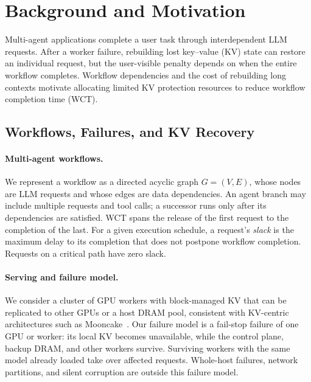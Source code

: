 \section{Background and Motivation}
\label{sec:background-motivation}

Multi-agent applications complete a user task through interdependent LLM
requests. After a worker failure, rebuilding lost key--value (KV) state can
restore an individual request, but the user-visible penalty depends on when
the entire workflow completes. Workflow dependencies and the cost of
rebuilding long contexts motivate allocating limited KV protection resources
to reduce workflow completion time (WCT).



\subsection{Workflows, Failures, and KV Recovery}
\label{sec:motivation-background}

\paragraph{Multi-agent workflows.}
We represent a workflow as a directed acyclic graph $G=(V,E)$, whose nodes
are LLM requests and whose edges are data dependencies. An agent branch may
include multiple requests and tool calls; a successor runs only after its
dependencies are satisfied. WCT spans the release of the first request to
the completion of the last. For a given execution schedule, a request's
\emph{slack} is the maximum delay to its completion that does not postpone
workflow completion. Requests on a critical path have zero slack.

\paragraph{Serving and failure model.}
We consider a cluster of GPU workers with block-managed KV that can be
replicated to other GPUs or a host DRAM pool, consistent with KV-centric
architectures such as Mooncake~\cite{qin2025mooncake}. Our failure model is
a fail-stop failure of one GPU or worker: its local KV becomes unavailable,
while the control plane, backup DRAM, and other workers survive. Surviving
workers with the same model already loaded take over affected requests.
Whole-host failures, network partitions, and silent corruption are outside
this failure model.

